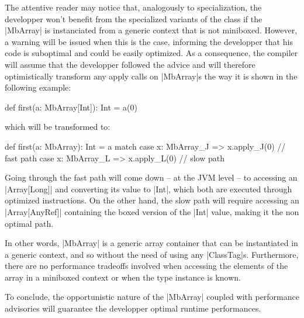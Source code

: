 The attentive reader may notice that, analogously to specialization, the developper won't benefit from the specialized variants of the class if the |MbArray| is instanciated from a generic context that is not miniboxed. However, a warning will be issued when this is the case, informing the developper that his code is suboptimal and could be easily optimized. As a consequence, the compiler will assume that the developper followed the advice and will therefore optimistically transform any apply calls on |MbArray|s the way it is shown in the following example:

\begin{lstlisting-nobreak}
 def first(a: MbArray[Int]): Int = a(0)
\end{lstlisting-nobreak}

which will be transformed to:

\begin{lstlisting-nobreak}
 def first(a: MbArray): Int = 
   a match {
     case x: MbArray_J => x.apply_J(0) // fast path
     case x: MbArray_L => x.apply_L(0) // slow path
   }
\end{lstlisting-nobreak}

Going through the fast path will come down -- at the JVM level -- to accessing an |Array[Long]| and converting its value to |Int|, which both are executed through optimized instructions. On the other hand, the slow path will require accessing an |Array[AnyRef]| containing the boxed version of the |Int| value, making it the non optimal path.

In other words, |MbArray| is a generic array container that can be instantiated in a generic context, and so without the need of using any |ClassTag|s. Furthermore, there are no performance tradeoffs involved when accessing the elements of the array in a miniboxed context or when the type instance is known. 


To conclude, the opportunistic nature of the |MbArray| coupled with performance advisories will guarantee the developper optimal runtime performances. 

